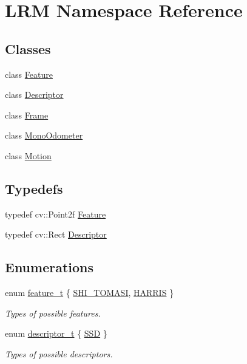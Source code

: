 \hypertarget{namespaceLRM}{\section{\-L\-R\-M \-Namespace \-Reference}
\label{namespaceLRM}
}
\subsection*{\-Classes}
\begin{DoxyCompactItemize}
\item 
class \hyperlink{classLRM_1_1Feature}{\-Feature}
\item 
class \hyperlink{classLRM_1_1Descriptor}{\-Descriptor}
\item 
class \hyperlink{classLRM_1_1Frame}{\-Frame}
\item 
class \hyperlink{classLRM_1_1MonoOdometer}{\-Mono\-Odometer}
\item 
class \hyperlink{classLRM_1_1Motion}{\-Motion}
\end{DoxyCompactItemize}
\subsection*{\-Typedefs}
\begin{DoxyCompactItemize}
\item 
typedef cv\-::\-Point2f \hyperlink{namespaceLRM_a83d84534368107ba7cdbde260cfc3070}{\-Feature}
\item 
typedef cv\-::\-Rect \hyperlink{namespaceLRM_aa94fd446417fb568723141ba14bde953}{\-Descriptor}
\end{DoxyCompactItemize}
\subsection*{\-Enumerations}
\begin{DoxyCompactItemize}
\item 
enum \hyperlink{namespaceLRM_a8eb6956b84fb7d27bce5af771937794f}{feature\-\_\-t} \{ \hyperlink{namespaceLRM_a8eb6956b84fb7d27bce5af771937794fa8e3a2d26370c85d7adb97cbbd40abc72}{\-S\-H\-I\-\_\-\-T\-O\-M\-A\-S\-I}, 
\hyperlink{namespaceLRM_a8eb6956b84fb7d27bce5af771937794fa82f8a835c4a989b4beddacd8082dc75d}{\-H\-A\-R\-R\-I\-S}
 \}
\begin{DoxyCompactList}\small\item\em \-Types of possible features. \end{DoxyCompactList}\item 
enum \hyperlink{namespaceLRM_ad31d475a7f32e1bd208beb34aabc6fa9}{descriptor\-\_\-t} \{ \hyperlink{namespaceLRM_ad31d475a7f32e1bd208beb34aabc6fa9a1e43a18048d2fc5fc782f2eebce0d585}{\-S\-S\-D}
 \}
\begin{DoxyCompactList}\small\item\em \-Types of possible descriptors. \end{DoxyCompactList}\end{DoxyCompactItemize}


